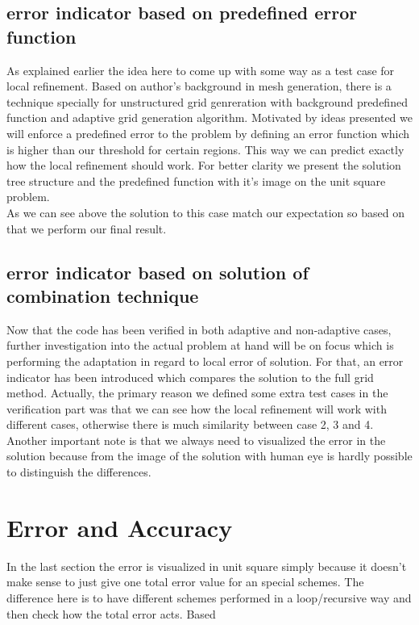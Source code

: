 \subsection{error indicator based on predefined error function}
As explained earlier the idea here to come up with some way as a test case for local refinement. Based on author's background in mesh generation, there is a technique specially for unstructured grid genreration with background predefined function \cite{Henshaw1996} and adaptive grid generation algorithm\citep{Ebeida2010}. Motivated by ideas presented we will enforce a predefined error to the problem by defining an error function which is higher than our threshold for certain regions. This way we can predict exactly how the local refinement should work. For better clarity we present the solution tree structure and the predefined function with it's image on the unit square problem.\\ %
As we can see above the solution to this case match our expectation so based on that we perform our final result.
\subsection{error indicator based on solution of combination technique}
Now that the code has been verified in both adaptive and non-adaptive cases, further investigation into the actual problem at hand will be on focus which is performing the adaptation in regard to local error of solution. For that, an error indicator has been introduced which compares the solution to the full grid method. Actually, the primary reason we defined some extra test cases in the verification part was that we can see how the local refinement will work with different cases, otherwise there is much similarity between case 2, 3 and 4. \\

Another important note is that we always need to visualized the error in the solution because from the image of the solution with human eye is hardly possible to distinguish the differences.

\section{Error and Accuracy}
In the last section the error is visualized in unit square simply because it doesn't make sense to just give one total error value for an special schemes. The difference here is to have different schemes performed in a loop/recursive way and then check how the total error acts. Based  
